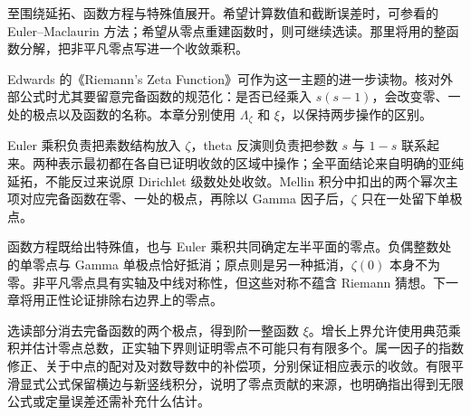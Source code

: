 至围绕延拓、函数方程与特殊值展开。希望计算数值和截断误差时，可参看的 Euler–Maclaurin 方法；希望从零点重建函数时，则可继续选读。那里将用的整函数分解，把非平凡零点写进一个收敛乘积。

Edwards 的《Riemann's Zeta Function》\cite{Edwards2001Riemann}可作为这一主题的进一步读物。核对外部公式时尤其要留意完备函数的规范化：是否已经乘入 \(s(s-1)\)，会改变零、一处的极点以及函数的名称。本章分别使用 \(\Lambda_\zeta\) 和 \(\xi\)，以保持两步操作的区别。








\begin{chaptersummary}
Euler 乘积负责把素数结构放入 \(\zeta\)，theta 反演则负责把参数 \(s\) 与 \(1-s\) 联系起来。两种表示最初都在各自已证明收敛的区域中操作；全平面结论来自明确的亚纯延拓，不能反过来说原 Dirichlet 级数处处收敛。Mellin 积分中扣出的两个幂次主项对应完备函数在零、一处的极点，再除以 Gamma 因子后，\(\zeta\) 只在一处留下单极点。

函数方程既给出特殊值，也与 Euler 乘积共同确定左半平面的零点。负偶整数处的单零点与 Gamma 单极点恰好抵消；原点则是另一种抵消，\(\zeta(0)\) 本身不为零。非平凡零点具有实轴及中线对称性，但这些对称不蕴含 Riemann 猜想。下一章将用正性论证排除右边界上的零点。

选读部分消去完备函数的两个极点，得到阶一整函数 \(\xi\)。增长上界允许使用典范乘积并估计零点总数，正实轴下界则证明零点不可能只有有限多个。属一因子的指数修正、关于中点的配对及对数导数中的补偿项，分别保证相应表示的收敛。有限平滑显式公式保留横边与新竖线积分，说明了零点贡献的来源，也明确指出得到无限公式或定量误差还需补充什么估计。
\end{chaptersummary}

\BookExercises



